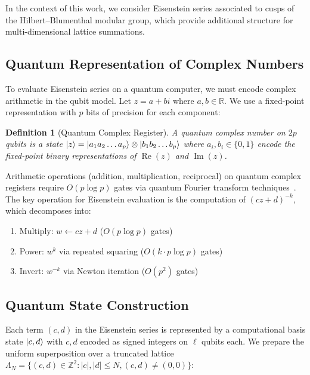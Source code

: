 \documentclass[11pt,a4paper]{article}
\newtheorem{definition}{Definition}[section]
\begin{document}
In the context of this work, we consider Eisenstein series associated
to cusps of the Hilbert--Blumenthal modular group, which provide
additional structure for multi-dimensional lattice summations.

\subsection{Quantum Representation of Complex Numbers}\label{sec:qrep}

To evaluate Eisenstein series on a quantum computer, we must encode
complex arithmetic in the qubit model. Let $z = a + bi$ where
$a, b \in \mathbb{R}$. We use a fixed-point representation with
$p$ bits of precision for each component:

\begin{definition}[Quantum Complex Register]
A quantum complex number on $2p$ qubits is a state
$\ket{z} = \ket{a_1 a_2 \ldots a_p} \otimes \ket{b_1 b_2 \ldots b_p}$
where $a_i, b_i \in \{0,1\}$ encode the fixed-point binary
representations of $\operatorname{Re}(z)$ and $\operatorname{Im}(z)$.
\end{definition}

Arithmetic operations (addition, multiplication, reciprocal) on
quantum complex registers require $O(p \log p)$ gates via quantum
Fourier transform techniques~\cite{nielsen2010}. The key operation
for Eisenstein evaluation is the computation of $(cz+d)^{-k}$, which
decomposes into:

\begin{enumerate}[nosep]
  \item Multiply: $w \leftarrow cz + d$ \quad ($O(p \log p)$ gates)
  \item Power: $w^k$ via repeated squaring \quad ($O(k \cdot p \log p)$ gates)
  \item Invert: $w^{-k}$ via Newton iteration \quad ($O(p^2)$ gates)
\end{enumerate}

\subsection{Quantum State Construction}

Each term $(c,d)$ in the Eisenstein series is represented by a
computational basis state $\ket{c,d}$ with $c,d$ encoded as signed
integers on $\ell$ qubits each. We prepare the uniform superposition
over a truncated lattice $\Lambda_N = \{(c,d) \in \mathbb{Z}^2 :
|c|, |d| \leq N, (c,d) \neq (0,0)\}$:
\end{document}
